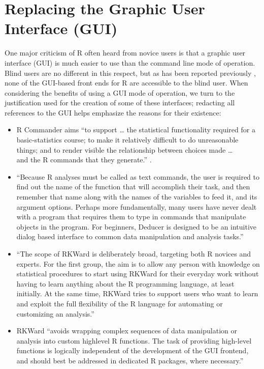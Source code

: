 \documentclass[
]{book}
\providecommand{\tightlist}{%
  \setlength{\itemsep}{0pt}\setlength{\parskip}{0pt}}
\begin{document}
\hypertarget{replacing-the-graphic-user-interface-gui}{%
\section{Replacing the Graphic User Interface (GUI)}\label{replacing-the-graphic-user-interface-gui}}

One major criticism of R often heard from novice users is that a graphic user interface (GUI) is much easier to use than the command line mode of operation. Blind users are no different in this respect, but as has been reported previously \citep{GodfreyRJournal}, none of the GUI-based front ends for R are accessible to the blind user.
When considering the benefits of using a GUI mode of operation, we turn to the justification used for the creation of some of these interfaces; redacting all references to the GUI helps emphasize the reasons for their existence:

\begin{itemize}
\tightlist
\item
  R Commander aims ``to support \ldots{} the statistical functionality required for a basic-statistics course; to make it relatively difficult to do unreasonable things;
  and to render visible the relationship between choices made \ldots{}\\
  and the R commands that they generate.'' \citep{Fox2005-RCommander}.
\item
  ``Because R analyses must be called as text commands, the user is required to find out the name of the function that will accomplish their task, and then remember that name along with the names of the variables to feed it, and its argument options. Perhaps more fundamentally, many users have never dealt with a program that requires them to type in commands that manipulate objects in the program.
  For beginners, Deducer is designed to be an intuitive dialog based interface to common data manipulation and analysis tasks.'' \citep{Fellows2012Deducer}
\item
  ``The scope of RKWard is deliberately broad, targeting both R novices and experts. For the first group, the aim is to allow any person with knowledge on statistical procedures to start using RKWard for their everyday work without having to learn anything about the R programming language, at least initially. At the same time, RKWard tries to support users who want to learn and exploit the full flexibility of the R language for automating or customizing an analysis.'' \citep{RoedigerEtAl2012RKWard}
\item
  RKWard ``avoids wrapping complex sequences of data manipulation or analysis into custom highlevel R functions. The task of providing high-level functions is logically independent of the development of the GUI frontend, and should best be addressed in dedicated R packages, where
  necessary.'' \citep{RoedigerEtAl2012RKWard}
\end{itemize}
\end{document}
